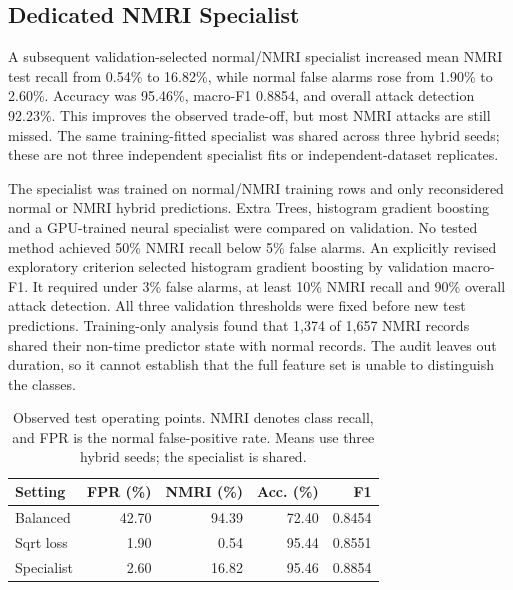 \subsection{Dedicated NMRI Specialist}
A subsequent validation-selected normal/NMRI specialist increased mean NMRI test recall from 0.54\% to 16.82\%, while normal false alarms rose from 1.90\% to 2.60\%. Accuracy was 95.46\%, macro-F1 0.8854, and overall attack detection 92.23\%. This improves the observed trade-off, but most NMRI attacks are still missed. The same training-fitted specialist was shared across three hybrid seeds; these are not three independent specialist fits or independent-dataset replicates.

The specialist was trained on normal/NMRI training rows and only reconsidered normal or NMRI hybrid predictions. Extra Trees, histogram gradient boosting and a GPU-trained neural specialist were compared on validation. No tested method achieved 50\% NMRI recall below 5\% false alarms. An explicitly revised exploratory criterion selected histogram gradient boosting by validation macro-F1. It required under 3\% false alarms, at least 10\% NMRI recall and 90\% overall attack detection. All three validation thresholds were fixed before new test predictions. Training-only analysis found that 1,374 of 1,657 NMRI records shared their non-time predictor state with normal records. The audit leaves out duration, so it cannot establish that the full feature set is unable to distinguish the classes.

\begin{table}[htbp]\centering\small\setlength{\tabcolsep}{3pt}

\begin{tabular}{lrrrr}
\toprule
Setting & FPR (\%) & NMRI (\%) & Acc. (\%) & F1 \\
\midrule
Balanced & 42.70 & 94.39 & 72.40 & 0.8454 \\
Sqrt loss & 1.90 & 0.54 & 95.44 & 0.8551 \\
Specialist & 2.60 & 16.82 & 95.46 & 0.8854 \\
\bottomrule
\end{tabular}


\caption{Observed test operating points. NMRI denotes class recall, and FPR is the normal false-positive rate. Means use three hybrid seeds; the specialist is shared.}
\end{table}
